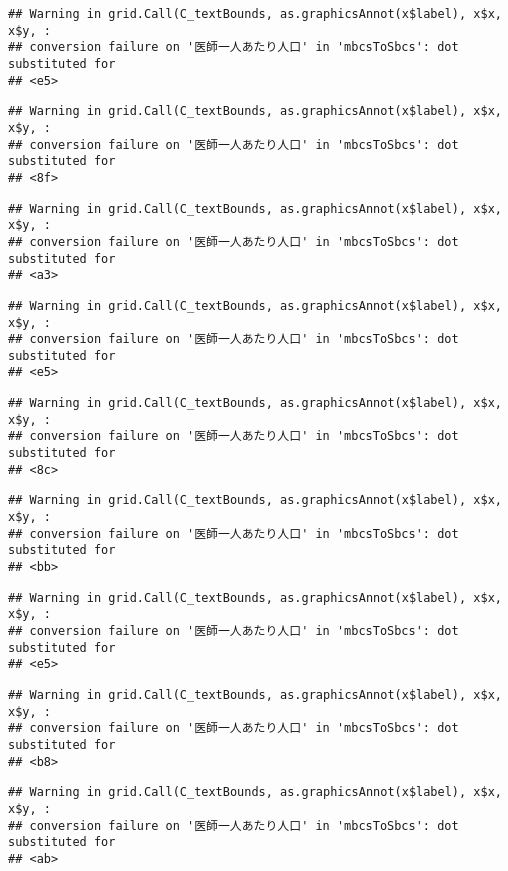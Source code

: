 \documentclass[
]{article}
\begin{document}
\begin{verbatim}
## Warning in grid.Call(C_textBounds, as.graphicsAnnot(x$label), x$x, x$y, :
## conversion failure on '医師一人あたり人口' in 'mbcsToSbcs': dot substituted for
## <e5>
\end{verbatim}

\begin{verbatim}
## Warning in grid.Call(C_textBounds, as.graphicsAnnot(x$label), x$x, x$y, :
## conversion failure on '医師一人あたり人口' in 'mbcsToSbcs': dot substituted for
## <8f>
\end{verbatim}

\begin{verbatim}
## Warning in grid.Call(C_textBounds, as.graphicsAnnot(x$label), x$x, x$y, :
## conversion failure on '医師一人あたり人口' in 'mbcsToSbcs': dot substituted for
## <a3>
\end{verbatim}

\begin{verbatim}
## Warning in grid.Call(C_textBounds, as.graphicsAnnot(x$label), x$x, x$y, :
## conversion failure on '医師一人あたり人口' in 'mbcsToSbcs': dot substituted for
## <e5>
\end{verbatim}

\begin{verbatim}
## Warning in grid.Call(C_textBounds, as.graphicsAnnot(x$label), x$x, x$y, :
## conversion failure on '医師一人あたり人口' in 'mbcsToSbcs': dot substituted for
## <8c>
\end{verbatim}

\begin{verbatim}
## Warning in grid.Call(C_textBounds, as.graphicsAnnot(x$label), x$x, x$y, :
## conversion failure on '医師一人あたり人口' in 'mbcsToSbcs': dot substituted for
## <bb>
\end{verbatim}

\begin{verbatim}
## Warning in grid.Call(C_textBounds, as.graphicsAnnot(x$label), x$x, x$y, :
## conversion failure on '医師一人あたり人口' in 'mbcsToSbcs': dot substituted for
## <e5>
\end{verbatim}

\begin{verbatim}
## Warning in grid.Call(C_textBounds, as.graphicsAnnot(x$label), x$x, x$y, :
## conversion failure on '医師一人あたり人口' in 'mbcsToSbcs': dot substituted for
## <b8>
\end{verbatim}

\begin{verbatim}
## Warning in grid.Call(C_textBounds, as.graphicsAnnot(x$label), x$x, x$y, :
## conversion failure on '医師一人あたり人口' in 'mbcsToSbcs': dot substituted for
## <ab>
\end{verbatim}
\end{document}

